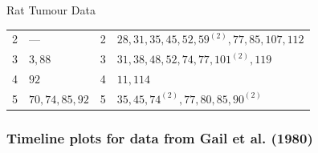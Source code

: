 \documentclass[oneside]{book}\usepackage[]{graphicx}\usepackage[svgnames]{xcolor}
\begin{document}
\begin{Example}{Rat Tumour Data}
\begin{center}
\begin{NiceTabular}{clcl}
                  2                            & ---                      & 2                          & $28, 31, 35, 45, 52, 59^{(2)} , 77, 85, 107, 112$ \\
                  3                            & $3,88$                   & 3                          & $31, 38, 48, 52, 74, 77, 101^{(2)} , 119$         \\
                  4                            & $92$                     & 4                          & $ 11, 114  $                                \\
                  5                            & $70,74,85,92$            & 5                          & $35,45,74^{(2)},77,80,85,90^{(2)}$              \\
                  \bottomrule
            \end{NiceTabular}
      \end{center}
\end{Example}
\subsubsection*{Timeline plots for data from Gail et al. (1980)}
\end{document}
